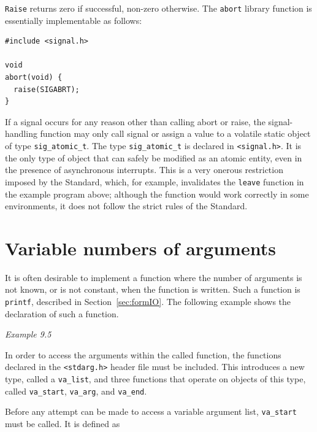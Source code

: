   \texttt{Raise} returns zero if successful, non-zero  otherwise.   The
   \texttt{abort}  library  function  is  essentially  implementable  as
   follows:


  \begin{Verbatim}
#include <signal.h>

void
abort(void) {
  raise(SIGABRT);
}
\end{Verbatim}

  If a signal occurs for any reason other than  calling  abort or  raise,
   the signal-handling function may only call signal or assign a value  to
   a  volatile  static  object  of  type \texttt{sig\_atomic\_t}.    The type
   \texttt{sig\_atomic\_t}  is  declared  in \texttt{<signal.h>}.
   It is the only type of object that  can safely be  modified  as  an  atomic
   entity, even in the presence of asynchronous interrupts.  This is a very
   onerous restriction imposed by the Standard, which, for example, invalidates
   the \texttt{leave} function in the example program  above;  although
   the function  would work correctly in some environments, it does not follow
   the strict rules of the Standard.


 
        \section{Variable numbers of arguments}\label{sec:varargs}
        

  

  It is often desirable to implement a function where the number of
   arguments is not known, or is not constant, when the function is written.
   Such a function is \texttt{printf}, described in Section~\ref{sec:formIO}.
   The following example shows the declaration of such a function.


  \begin{center}\textit{Example 9.5}\end{center}


  In order to access the arguments within the called function, the functions
   declared in the \texttt{<stdarg.h>} header file must be included.
   This introduces a new type, called a \texttt{va\_list}, and three
   functions that operate on objects of this type, called
   \texttt{va\_start}, \texttt{va\_arg}, and \texttt{va\_end}.


  Before any attempt can be made to access a variable argument list,
   \texttt{va\_start} must be called.  It is defined as


